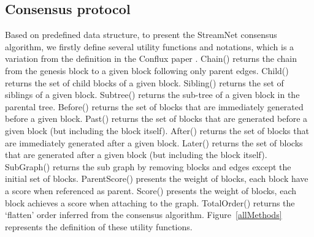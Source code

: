 



\subsection{Consensus protocol}
Based on predefined data structure, to present the StreamNet consensus algorithm, 
we firstly define several utility functions and notations, which is a variation from the definition in the Conflux paper \cite{li2018scaling}. 
Chain() returns the chain from the genesis block to a given block following only parent edges. 
Child() returns the set of child blocks of a given block. 
Sibling() returns the set of siblings of a given block. 
Subtree() returns the sub-tree of a given block in the parental tree. 
Before() returns the set of blocks that are immediately generated before a given block. 
Past() returns the set of blocks that are generated before a given block (but including the block itself).
After() returns the set of blocks that are immediately generated after a given block. 
Later() returns the set of blocks that are generated after a given block (but including the block itself).
SubGraph() returns the sub graph by removing blocks and edges except the initial set of blocks.
ParentScore() presents the weight of blocks, each block have a score when referenced as parent. 
Score() presents the weight of blocks, each block achieves a score when attaching to the graph. 
TotalOrder() returns the `flatten' order inferred from the consensus algorithm.
Figure~\ref{allMethods} represents the definition of these utility functions. 

